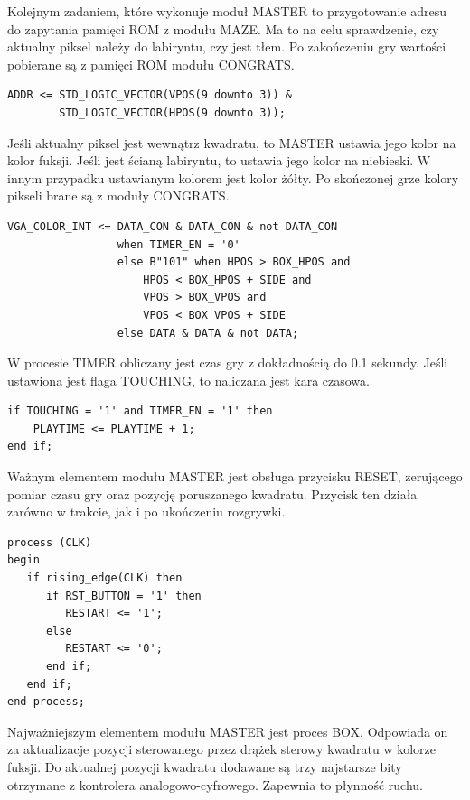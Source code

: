 \documentclass[11pt]{article}
\begin{document}
Kolejnym zadaniem, które wykonuje moduł MASTER to przygotowanie adresu do zapytania pamięci ROM z modułu MAZE.
Ma to na celu sprawdzenie, czy aktualny piksel należy do labiryntu, czy jest tłem.
Po zakończeniu gry wartości pobierane są z pamięci ROM modułu CONGRATS.

\begin{lstlisting}
ADDR <= STD_LOGIC_VECTOR(VPOS(9 downto 3)) &
        STD_LOGIC_VECTOR(HPOS(9 downto 3));
\end{lstlisting}

Jeśli aktualny piksel jest wewnątrz kwadratu, to MASTER ustawia jego kolor na kolor fuksji.
Jeśli jest ścianą labiryntu, to ustawia jego kolor na niebieski.
W innym przypadku ustawianym kolorem jest kolor żółty.
Po skończonej grze kolory pikseli brane są z moduły CONGRATS.

\begin{lstlisting}
VGA_COLOR_INT <= DATA_CON & DATA_CON & not DATA_CON
                 when TIMER_EN = '0'
                 else B"101" when HPOS > BOX_HPOS and
                     HPOS < BOX_HPOS + SIDE and
                     VPOS > BOX_VPOS and
                     VPOS < BOX_VPOS + SIDE
                 else DATA & DATA & not DATA;

\end{lstlisting}

W procesie TIMER obliczany jest czas gry z dokładnością do 0.1 sekundy. 
Jeśli ustawiona jest flaga TOUCHING, to naliczana jest kara czasowa.

\begin{lstlisting}
if TOUCHING = '1' and TIMER_EN = '1' then
    PLAYTIME <= PLAYTIME + 1;
end if;
\end{lstlisting}

Ważnym elementem modułu MASTER jest obsługa przycisku RESET, zerującego pomiar czasu gry oraz pozycję poruszanego kwadratu. 
Przycisk ten działa zarówno w trakcie, jak i po ukończeniu rozgrywki. 

\begin{lstlisting}
process (CLK)
begin
   if rising_edge(CLK) then
      if RST_BUTTON = '1' then
         RESTART <= '1';
      else
         RESTART <= '0';
      end if;
   end if;
end process;
\end{lstlisting}

Najważniejszym elementem modułu MASTER jest proces BOX. 
Odpowiada on za aktualizacje pozycji sterowanego przez drążek sterowy kwadratu w kolorze fuksji.
Do aktualnej pozycji kwadratu dodawane są trzy najstarsze bity otrzymane z kontrolera analogowo-cyfrowego.
Zapewnia to płynność ruchu.
\end{document}
